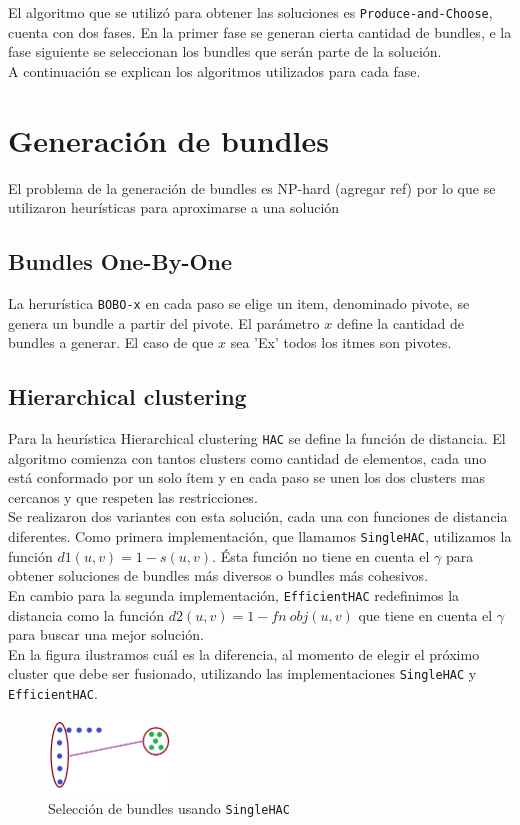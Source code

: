 El algoritmo que se utilizó para obtener las soluciones es \texttt{Produce-and-Choose}, cuenta con 
dos fases.
En la primer fase se generan cierta cantidad de bundles, e la fase siguiente se seleccionan los 
bundles que serán parte de la solución.\\
A continuación se explican los algoritmos utilizados para cada fase.
\section{Generación de bundles}
El problema de la generación de bundles es NP-hard (agregar ref) por lo que se utilizaron heurísticas para aproximarse a una solución
\subsection{Bundles One-By-One}
La herurística \texttt{BOBO-x} en cada paso se elige un item, denominado pivote, se genera un bundle a partir del pivote. 
El parámetro $x$ define la cantidad de bundles a generar. El caso de que $x$ sea 'Ex' todos los itmes son pivotes.\\
\subsection{Hierarchical clustering}
Para la heurística Hierarchical clustering \texttt{HAC} se define la función de distancia. 
El algoritmo comienza con tantos clusters como cantidad de elementos, cada uno está conformado por un solo ítem y 
en cada paso se unen los dos clusters mas cercanos y que respeten las restricciones.\\
Se realizaron dos variantes con esta solución, cada una con funciones de distancia diferentes. 
Como primera implementación, que llamamos \texttt{SingleHAC}, utilizamos la función $d1(u,v) 
= 1 - s(u, v)$. Ésta función no tiene en cuenta el $\gamma$ para obtener soluciones de bundles más 
diversos o bundles más cohesivos.\\
En cambio para la segunda implementación, \texttt{EfficientHAC} redefinimos la distancia como la 
función $d2(u,v) = 1 - fn\ obj(u,v)$ que tiene en cuenta el $\gamma$ para buscar una mejor 
solución.\\
En la figura ilustramos cuál es la diferencia, al momento de elegir el próximo cluster que debe ser 
fusionado, utilizando las implementaciones \texttt{SingleHAC} y \texttt{EfficientHAC}.
\begin{figure}[H]
  \centering
    \includegraphics[width=0.3\textwidth]{img/cluster1.png}
  \caption{Selección de bundles usando \texttt{SingleHAC}}
  \label{res:img-usingSingleHAC}
\end{figure}

